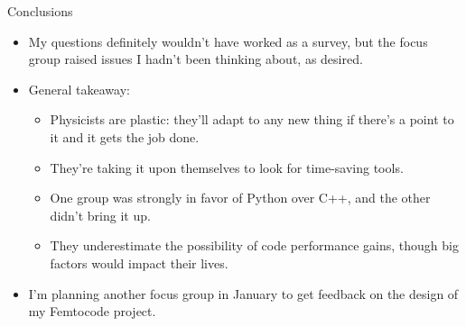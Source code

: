 \documentclass{beamer}
\begin{document}
\begin{frame}{Conclusions}
\vspace{0.25 cm}
\begin{itemize}\setlength{\itemsep}{0.5 cm}
\item My questions definitely wouldn't have worked as a survey, but the focus group raised issues I hadn't been thinking about, as desired.

\item General takeaway:
\begin{itemize}
\item Physicists are plastic: they'll adapt to any new thing if there's a point to it and it gets the job done.
\item They're taking it upon themselves to look for time-saving tools.
\item One group was strongly in favor of Python over C++, and the other didn't bring it up.
\item They underestimate the possibility of code performance gains, though big factors would impact their lives.
\end{itemize}

\item I'm planning another focus group in January to get feedback on the design of my Femtocode project.
\end{itemize}
\end{frame}
\end{document}
